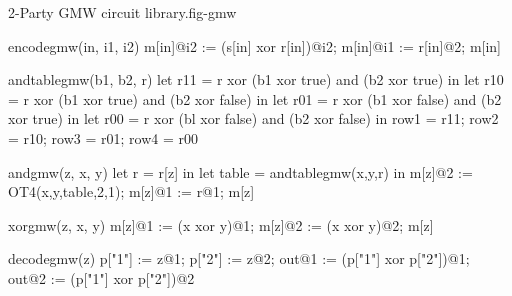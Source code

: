 \begin{fpfig}[t]{2-Party GMW circuit library.}{fig-gmw}
{\footnotesize
  \begin{verbatimtab}
    encodegmw(in, i1, i2) {
      m[in]@i2 := (s[in] xor r[in])@i2;
      m[in]@i1 := r[in]@2;
      m[in]
    }
    
    andtablegmw(b1, b2, r) {
      let r11 = r xor (b1 xor true) and (b2 xor true) in
      let r10 = r xor (b1 xor true) and (b2 xor false) in
      let r01 = r xor (b1 xor false) and (b2 xor true) in
      let r00 = r xor (bl xor false) and (b2 xor false) in
      { row1 = r11; row2 = r10; row3 = r01; row4 = r00 }
    }
    
    andgmw(z, x, y) {
      let r = r[z] in
      let table = andtablegmw(x,y,r) in
      m[z]@2 := OT4(x,y,table,2,1);
      m[z]@1 := r@1;
      m[z]
    }
    
    xorgmw(z, x, y)
    { m[z]@1 := (x xor y)@1; m[z]@2 := (x xor y)@2; m[z] }
    
    decodegmw(z) {
      p["1"] := z@1; p["2"] := z@2;
      out@1 := (p["1"] xor p["2"])@1;
      out@2 := (p["1"] xor p["2"])@2
    }
  \end{verbatimtab}
}
\end{fpfig}
